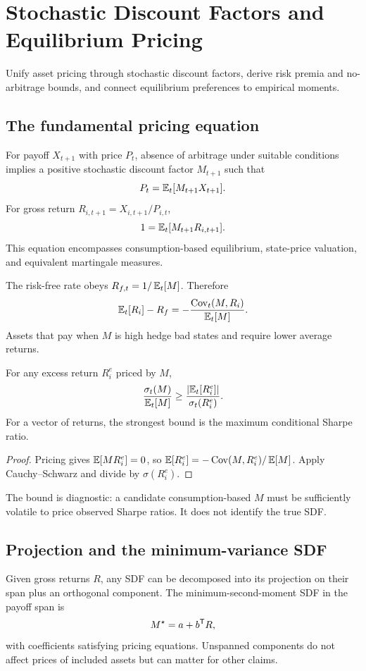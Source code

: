 \chapter{Stochastic Discount Factors and Equilibrium Pricing}

\begin{objectives}
Unify asset pricing through stochastic discount factors, derive risk premia and
no-arbitrage bounds, and connect equilibrium preferences to empirical moments.
\end{objectives}

\section{The fundamental pricing equation}

For payoff $X_{t+1}$ with price $P_t$, absence of arbitrage under suitable conditions
implies a positive stochastic discount factor $M_{t+1}$ such that
\[
P_t=\operatorname{\mathbb E}_t[M_{t+1}X_{t+1}].
\]
For gross return $R_{i,t+1}=X_{i,t+1}/P_{i,t}$,
\[
1=\operatorname{\mathbb E}_t[M_{t+1}R_{i,t+1}].
\]
This equation encompasses consumption-based equilibrium, state-price valuation, and
equivalent martingale measures.

The risk-free rate obeys $R_{f,t}=1/\operatorname{\mathbb E}_t[M]$. Therefore
\[
\operatorname{\mathbb E}_t[R_i]-R_f
=-\frac{\operatorname{Cov}_t(M,R_i)}{\operatorname{\mathbb E}_t[M]}.
\]
Assets that pay when $M$ is high hedge bad states and require lower average returns.

\begin{theorem}
For any excess return $R_i^e$ priced by $M$,
\[
\frac{\sigma_t(M)}{\operatorname{\mathbb E}_t[M]}
\geq
\frac{\left|\operatorname{\mathbb E}_t[R_i^e]\right|}{\sigma_t(R_i^e)}.
\]
For a vector of returns, the strongest bound is the maximum conditional Sharpe ratio.
\end{theorem}
\begin{proof}
Pricing gives $\operatorname{\mathbb E}[M R_i^e]=0$, so
$\operatorname{\mathbb E}[R_i^e]=-\operatorname{Cov}(M,R_i^e)/\operatorname{\mathbb E}[M]$. Apply Cauchy--Schwarz and divide by
$\sigma(R_i^e)$.
\end{proof}

The bound is diagnostic: a candidate consumption-based $M$ must be sufficiently
volatile to price observed Sharpe ratios. It does not identify the true SDF.

\section{Projection and the minimum-variance SDF}

Given gross returns $R$, any SDF can be decomposed into its projection on their span
plus an orthogonal component. The minimum-second-moment SDF in the payoff span is
\[
M^\star=a+b^\mathsf T R,
\]
with coefficients satisfying pricing equations. Unspanned components do not affect
prices of included assets but can matter for other claims.

